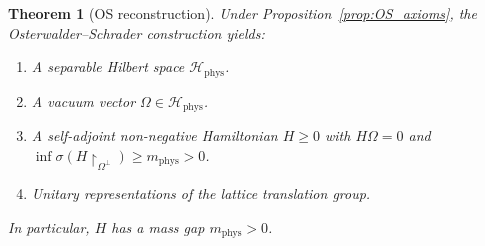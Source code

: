 \documentclass[11pt,a4paper]{amsart}
\newtheorem{theorem}{Theorem}[section]
\theoremstyle{definition}
\begin{document}
\begin{theorem}[OS reconstruction]
\label{thm:OS_reconstruction}
Under Proposition~\ref{prop:OS_axioms}, the Osterwalder--Schrader construction
yields:
\begin{enumerate}[label=(\roman*)]
\item A separable Hilbert space $\mathcal{H}_{\mathrm{phys}}$.
\item A vacuum vector $\Omega \in \mathcal{H}_{\mathrm{phys}}$.
\item A self-adjoint non-negative Hamiltonian $H \ge 0$ with
      $H\Omega = 0$ and $\inf\sigma(H\restriction_{\Omega^\perp}) \ge m_{\mathrm{phys}} > 0$.
\item Unitary representations of the lattice translation group.
\end{enumerate}
In particular, $H$ has a \emph{mass gap} $m_{\mathrm{phys}} > 0$.
\end{theorem}
\end{document}
